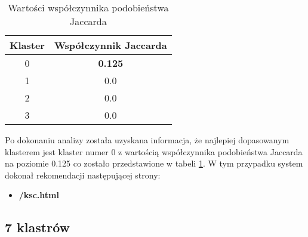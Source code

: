 \documentclass[../EDI_Task3_Karwowski_Kowalewski.tex]{subfiles}
\begin{document}
{{        \begin{table}[!htbp]
            \small
            \centering
            \begin{tabular}{|c|c|}
                \hline
                Klaster & Współczynnik Jaccarda \\ \hline
                0 & \textbf{0.125} \\
                1 & 0.0 \\
                2 & 0.0 \\
                3 & 0.0 \\ \hline
            \end{tabular}
            \caption{Wartości współczynnika podobieństwa Jaccarda}
            \label{coeffcient_5}
        \end{table}
        \FloatBarrier

        Po dokonaniu analizy została uzyskana informacja, że najlepiej dopasowanym
        klasterem jest klaster numer 0 z wartością współczynnika podobieństwa Jaccarda
        na poziomie 0.125 co zostało przedstawione w tabeli \ref{coeffcient_5}. W tym
        przypadku system dokonał rekomendacji następującej strony:
        \begin{itemize}
            \item \textbf{/ksc.html}
        \end{itemize}

    }

    \subsection{7 klastrów}
    \label{results_k_7} {

}}
\end{document}
